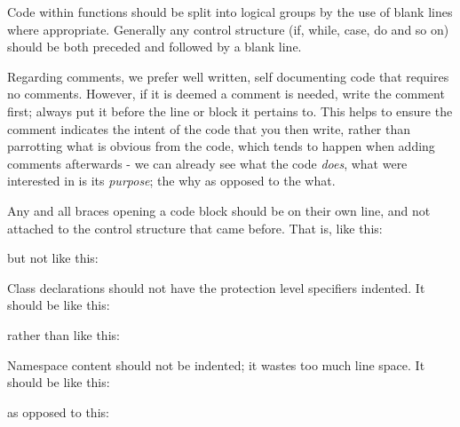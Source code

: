 \begin{DoxyItemize}
\item Code within functions should be split into logical groups by the use of blank lines where appropriate. Generally any control structure (if, while, case, do and so on) should be both preceded and followed by a blank line.
\item Regarding comments, we prefer well written, self documenting code that requires no comments. However, if it is deemed a comment is needed, write the comment first; always put it before the line or block it pertains to. This helps to ensure the comment indicates the intent of the code that you then write, rather than parrotting what is obvious from the code, which tends to happen when adding comments afterwards -\/ we can already see what the code {\itshape does}, what we\textquotesingle{}re interested in is it\textquotesingle{}s {\itshape purpose}; the why as opposed to the what.
\item Any and all braces opening a code block should be on their own line, and not attached to the control structure that came before. That is, like this\+: 
\begin{DoxyCode}{0}
\DoxyCodeLine{\{}
\DoxyCodeLine{\}}
\end{DoxyCode}
 but not like this\+: 
\begin{DoxyCode}{0}
\DoxyCodeLine{\}}
\end{DoxyCode}

\item Class declarations should not have the protection level specifiers indented. It should be like this\+: 
\begin{DoxyCode}{0}
\DoxyCodeLine{\{}
\DoxyCodeLine{\textcolor{keyword}{public}:}
\DoxyCodeLine{\};}
\end{DoxyCode}
 rather than like this\+: 
\begin{DoxyCode}{0}
\DoxyCodeLine{\{}
\DoxyCodeLine{    \textcolor{keyword}{public}:}
\DoxyCodeLine{\};}
\end{DoxyCode}

\item Namespace content should not be indented; it wastes too much line space. It should be like this\+: 
\begin{DoxyCode}{0}
\DoxyCodeLine{\{}
\DoxyCodeLine{\{}
\DoxyCodeLine{\textcolor{keyword}{public}:}
\end{DoxyCode}
 as opposed to this\+: 
\begin{DoxyCode}{0}
\DoxyCodeLine{\{}
\DoxyCodeLine{    \{}
\DoxyCodeLine{    \textcolor{keyword}{public}:}
\end{DoxyCode}


\end{DoxyItemize}
